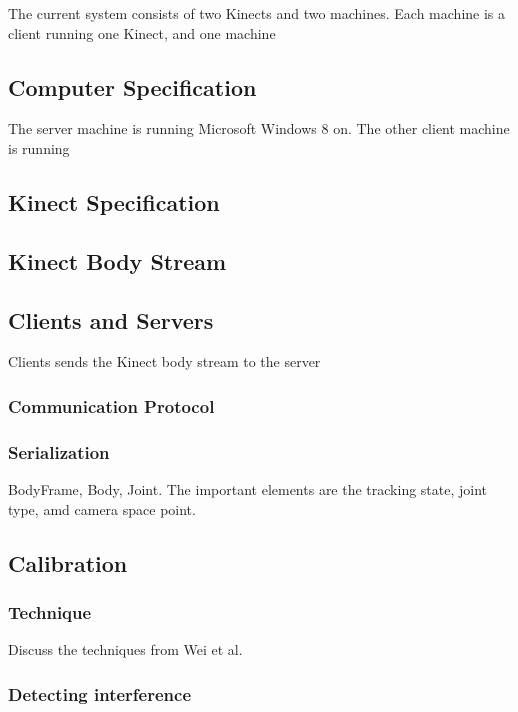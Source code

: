\documentclass{sigchi}
\begin{document}
The current system consists of two Kinects and two machines. Each machine is a client running one Kinect, and one machine 

\subsection{Computer Specification}

The server machine is running Microsoft Windows 8 on. The other client machine is running 

\subsection{Kinect Specification}

\subsection{Kinect Body Stream}

\subsection{Clients and Servers}

Clients sends the Kinect body stream to the server

\subsubsection{Communication Protocol}

\subsubsection{Serialization}

BodyFrame, Body, Joint. The important elements are the tracking state, joint type, amd camera space point.

\cite{microsoft_kinect_namespace}
\cite{microsoft_kinect_coordinates}

\subsection{Calibration}

\subsubsection{Technique}

Discuss the techniques from Wei et al.

\subsubsection{Detecting interference}
\end{document}

